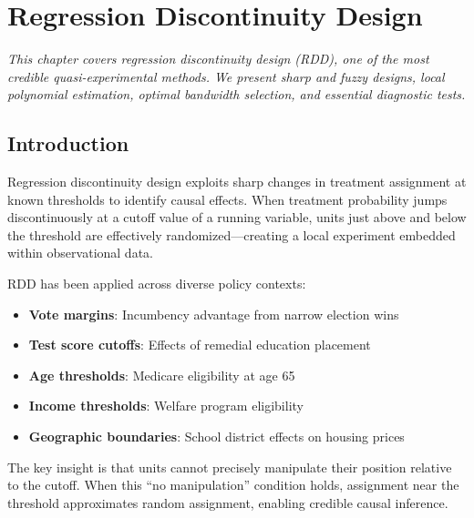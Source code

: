 
\chapter{Regression Discontinuity Design}
\label{ch:rdd}

\emph{This chapter covers regression discontinuity design (RDD), one of the most credible quasi-experimental methods. We present sharp and fuzzy designs, local polynomial estimation, optimal bandwidth selection, and essential diagnostic tests.}

\section{Introduction}
\label{sec:rdd_intro}

Regression discontinuity design exploits sharp changes in treatment assignment at known thresholds to identify causal effects. When treatment probability jumps discontinuously at a cutoff value of a running variable, units just above and below the threshold are effectively randomized---creating a local experiment embedded within observational data.

\begin{example}
RDD has been applied across diverse policy contexts:
\begin{itemize}
    \item \textbf{Vote margins}: Incumbency advantage from narrow election wins \citep{lee2008randomized}
    \item \textbf{Test score cutoffs}: Effects of remedial education placement
    \item \textbf{Age thresholds}: Medicare eligibility at age 65
    \item \textbf{Income thresholds}: Welfare program eligibility
    \item \textbf{Geographic boundaries}: School district effects on housing prices
\end{itemize}
\end{example}

The key insight is that units cannot precisely manipulate their position relative to the cutoff. When this ``no manipulation'' condition holds, assignment near the threshold approximates random assignment, enabling credible causal inference.

